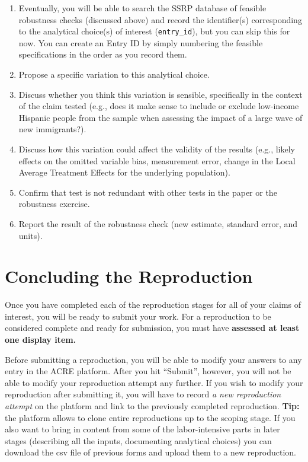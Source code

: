 \documentclass[
]{book}
\begin{document}
\begin{enumerate}
\def\labelenumi{\arabic{enumi}.}
\item
  Eventually, you will be able to search the SSRP database of feasible robustness checks (discussed above) and record the identifier(s) corresponding to the analytical choice(s) of interest (\texttt{entry\_id}), but you can skip this for now. You can create an Entry ID by simply numbering the feasible specifications in the order as you record them.
\item
  Propose a specific variation to this analytical choice.
\item
  Discuss whether you think this variation is sensible, specifically in the context of the claim tested (e.g., does it make sense to include or exclude low-income Hispanic people from the sample when assessing the impact of a large wave of new immigrants?).
\item
  Discuss how this variation could affect the validity of the results (e.g., likely effects on the omitted variable bias, measurement error, change in the Local Average Treatment Effects for the underlying population).
\item
  Confirm that test is not redundant with other tests in the paper or the robustness exercise.
\item
  Report the result of the robustness check (new estimate, standard error, and units).
\end{enumerate}

\hypertarget{concluding-the-reproduction}{%
\chapter{Concluding the Reproduction}\label{concluding-the-reproduction}}

Once you have completed each of the reproduction stages for all of your claims of interest, you will be ready to submit your work. For a reproduction to be considered complete and ready for submission, you must have \textbf{assessed at least one display item.}

Before submitting a reproduction, you will be able to modify your answers to any entry in the ACRE platform. After you hit ``Submit'', however, you will not be able to modify your reproduction attempt any further. If you wish to modify your reproduction after submitting it, you will have to record \emph{a new reproduction attempt} on the platform and link to the previously completed reproduction. \textbf{Tip:} the platform allows to clone entire reproductions up to the scoping stage. If you also want to bring in content from some of the labor-intensive parts in later stages (describing all the inputs, documenting analytical choices) you can download the csv file of previous forms and upload them to a new reproduction.
\end{document}
